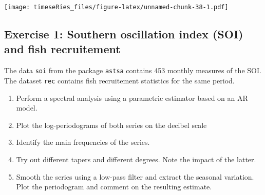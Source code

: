 \documentclass[]{book}
\newenvironment{Shaded}{\begin{snugshade}}{\end{snugshade}}
\newcommand{\CharTok}[1]{\textcolor[rgb]{0.31,0.60,0.02}{#1}}
\newcommand{\CommentTok}[1]{\textcolor[rgb]{0.56,0.35,0.01}{\textit{#1}}}
\newcommand{\DataTypeTok}[1]{\textcolor[rgb]{0.13,0.29,0.53}{#1}}
\newcommand{\DecValTok}[1]{\textcolor[rgb]{0.00,0.00,0.81}{#1}}
\newcommand{\FloatTok}[1]{\textcolor[rgb]{0.00,0.00,0.81}{#1}}
\newcommand{\KeywordTok}[1]{\textcolor[rgb]{0.13,0.29,0.53}{\textbf{#1}}}
\newcommand{\NormalTok}[1]{#1}
\newcommand{\OperatorTok}[1]{\textcolor[rgb]{0.81,0.36,0.00}{\textbf{#1}}}
\newcommand{\StringTok}[1]{\textcolor[rgb]{0.31,0.60,0.02}{#1}}
\providecommand{\tightlist}{%
  \setlength{\itemsep}{0pt}\setlength{\parskip}{0pt}}
\begin{document}
\begin{Shaded}
\end{Shaded}

\texttt{[image: timeseRies\_files/figure-latex/unnamed-chunk-38-1.pdf]}

\hypertarget{exercise-1-southern-oscillation-index-soi-and-fish-recruitement}{%
\subsection{Exercise 1: Southern oscillation index (SOI) and fish
recruitement}\label{exercise-1-southern-oscillation-index-soi-and-fish-recruitement}}

The data \texttt{soi} from the package \texttt{astsa} contains 453
monthly measures of the SOI. The dataset \texttt{rec} contains fish
recruitement statistics for the same period.

\begin{enumerate}
\def\labelenumi{\arabic{enumi}.}
\tightlist
\item
  Perform a spectral analysis using a parametric estimator based on an
  AR model.
\item
  Plot the log-periodograms of both series on the decibel scale
\item
  Identify the main frequencies of the series.
\item
  Try out different tapers and different degrees. Note the impact of the
  latter.
\item
  Smooth the series using a low-pass filter and extract the seasonal
  variation. Plot the periodogram and comment on the resulting estimate.
\end{enumerate}
\end{document}
